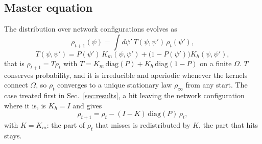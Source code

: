 \documentclass[pre,twocolumn,superscriptaddress,showpacs=false,amsmath,amssymb,nofootinbib]{revtex4-2}
\begin{document}
\subsection{Master equation}
The distribution over network configurations evolves as
\begin{equation}
\rho_{t+1}(\psi)=\int d\psi'\,T(\psi,\psi')\,\rho_t(\psi'),
\label{eq:master}
\end{equation}
\begin{equation}
T(\psi,\psi')=P(\psi')\,K_m(\psi,\psi')+\bigl(1-P(\psi')\bigr)K_h(\psi,\psi'),
\label{eq:T}
\end{equation}
that is $\rho_{t+1}=T\rho_t$ with $T=K_m\,\mathrm{diag}(P)+K_h\,\mathrm{diag}(1-P)$ on a finite $\Omega$. $T$ conserves probability, and it is irreducible and aperiodic whenever the kernels connect $\Omega$, so $\rho_t$ converges to a unique stationary law $\rho_\infty$ from any start. The case treated first in Sec.~\ref{sec:results}, a hit leaving the network configuration where it is, is $K_h=I$ and gives
\begin{equation}
\rho_{t+1}=\rho_t-(I-K)\,\mathrm{diag}(P)\,\rho_t ,
\label{eq:chain}
\end{equation}
with $K=K_m$: the part of $\rho_t$ that misses is redistributed by $K$, the part that hits stays.
\end{document}
